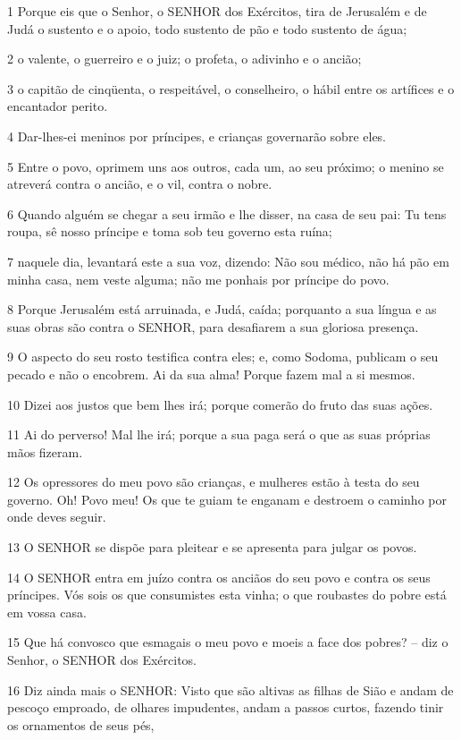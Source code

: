 \par 1 Porque eis que o Senhor, o SENHOR dos Exércitos, tira de Jerusalém e de Judá o sustento e o apoio, todo sustento de pão e todo sustento de água;
\par 2 o valente, o guerreiro e o juiz; o profeta, o adivinho e o ancião;
\par 3 o capitão de cinqüenta, o respeitável, o conselheiro, o hábil entre os artífices e o encantador perito.
\par 4 Dar-lhes-ei meninos por príncipes, e crianças governarão sobre eles.
\par 5 Entre o povo, oprimem uns aos outros, cada um, ao seu próximo; o menino se atreverá contra o ancião, e o vil, contra o nobre.
\par 6 Quando alguém se chegar a seu irmão e lhe disser, na casa de seu pai: Tu tens roupa, sê nosso príncipe e toma sob teu governo esta ruína;
\par 7 naquele dia, levantará este a sua voz, dizendo: Não sou médico, não há pão em minha casa, nem veste alguma; não me ponhais por príncipe do povo.
\par 8 Porque Jerusalém está arruinada, e Judá, caída; porquanto a sua língua e as suas obras são contra o SENHOR, para desafiarem a sua gloriosa presença.
\par 9 O aspecto do seu rosto testifica contra eles; e, como Sodoma, publicam o seu pecado e não o encobrem. Ai da sua alma! Porque fazem mal a si mesmos.
\par 10 Dizei aos justos que bem lhes irá; porque comerão do fruto das suas ações.
\par 11 Ai do perverso! Mal lhe irá; porque a sua paga será o que as suas próprias mãos fizeram.
\par 12 Os opressores do meu povo são crianças, e mulheres estão à testa do seu governo. Oh! Povo meu! Os que te guiam te enganam e destroem o caminho por onde deves seguir.
\par 13 O SENHOR se dispõe para pleitear e se apresenta para julgar os povos.
\par 14 O SENHOR entra em juízo contra os anciãos do seu povo e contra os seus príncipes. Vós sois os que consumistes esta vinha; o que roubastes do pobre está em vossa casa.
\par 15 Que há convosco que esmagais o meu povo e moeis a face dos pobres? -- diz o Senhor, o SENHOR dos Exércitos.
\par 16 Diz ainda mais o SENHOR: Visto que são altivas as filhas de Sião e andam de pescoço emproado, de olhares impudentes, andam a passos curtos, fazendo tinir os ornamentos de seus pés,
